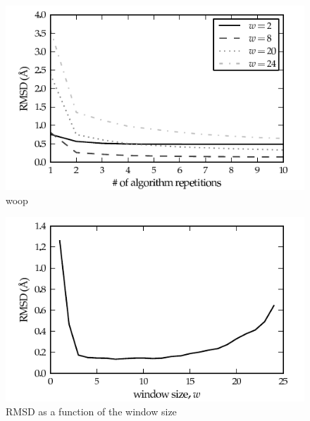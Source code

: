 \begin{figure}
	\centering
	\hspace*{-3.5mm}\includegraphics[width=1.1\columnwidth]{figures/plot_rmsd_convergence}
	\caption{woop}
	\label{fig:rmsd_convergence}
\end{figure}

	


\begin{figure}
	\centering
	\hspace*{-3.5mm}\includegraphics[width=1.1\columnwidth]{figures/plot_rmsd}
	\caption{RMSD as a function of the window size}
	\label{fig:rmsd_windowsize}
\end{figure}




